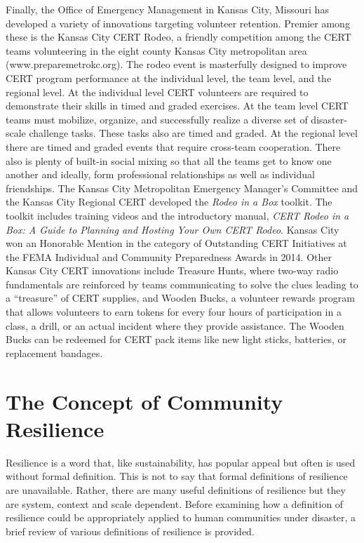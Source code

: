 \documentclass[11pt,fleqn]{book} %
\begin{document}
\noindent Finally, the Office of Emergency Management in Kansas City, Missouri has developed a variety of innovations targeting volunteer retention. Premier among these is the Kansas City CERT Rodeo, a friendly competition among the CERT teams volunteering in the eight county Kansas City metropolitan area (www.preparemetrokc.org). The rodeo event is masterfully designed to improve CERT program performance at the individual level, the team level, and the regional level. At the individual level CERT volunteers are required to demonstrate their skills in timed and graded exercises. At the team level CERT teams must mobilize, organize, and successfully realize a diverse set of disaster-scale challenge tasks. These tasks also are timed and graded. At the regional level there are timed and graded events that require cross-team cooperation. There also is plenty of built-in social mixing so that all the teams get to know one another and ideally, form professional relationships as well as individual friendships. The Kansas City Metropolitan Emergency Manager's Committee and the Kansas City Regional CERT developed the \textit{Rodeo in a Box} toolkit. The toolkit includes training videos and the introductory manual, \textit{CERT Rodeo in a Box: A Guide to Planning and Hosting Your Own CERT Rodeo}. Kansas City won an Honorable Mention in the category of Outstanding CERT Initiatives at the FEMA Individual and Community Preparedness Awards in 2014. Other Kansas City CERT innovations include Treasure Hunts, where two-way radio fundamentals are reinforced by teams communicating to solve the clues leading to a \enquote{treasure} of CERT supplies, and Wooden Bucks, a volunteer rewards program that allows volunteers to earn tokens for every four hours of participation in a class, a drill, or an actual incident where they provide assistance. The Wooden Bucks can be redeemed for CERT pack items like new light sticks, batteries, or replacement bandages.
 
\vspace{2em}
\section{The Concept of Community Resilience}
Resilience is a word that, like sustainability, has popular appeal but often is used without formal definition. This is not to say that formal definitions of resilience are unavailable. Rather, there are many useful definitions of resilience but they are system, context and scale dependent. Before examining how a definition of resilience could be appropriately applied to human communities under disaster, a brief review of various definitions of resilience is provided.\\
\end{document}

